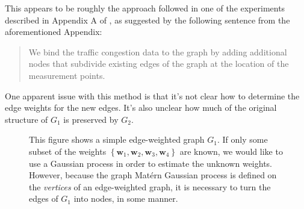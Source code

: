 This appears to be roughly the approach followed in one of the experiments described in Appendix A of \cite{pmlr-v130-borovitskiy21a}, as suggested by the following sentence from the aforementioned Appendix:

\begin{quote}
    We bind the traffic congestion data to the graph by adding additional nodes that subdivide existing edges of the graph at the location of the measurement points.
\end{quote}

One apparent issue with this method is that it's not clear how to determine the edge weights for the new edges. It's also unclear how much of the original structure of $G_1$ is preserved by $G_2$.

\begin{figure}
    \begin{center}
    \end{center}
    \caption{This figure shows a simple edge-weighted graph $G_1$. If only some subset of the weights $\left\{ \mathbf w_1, \mathbf w_2, \mathbf w_3, \mathbf w_4 \right\}$ are known, we would like to use a Gaussian process in order to estimate the unknown weights. However, because the graph Mat\'{e}rn Gaussian process is defined on the \textit{vertices} of an edge-weighted graph, it is necessary to turn the edges of $G_1$ into nodes, in some manner.}
    \label{fig:add_nodes_1}
\end{figure}

